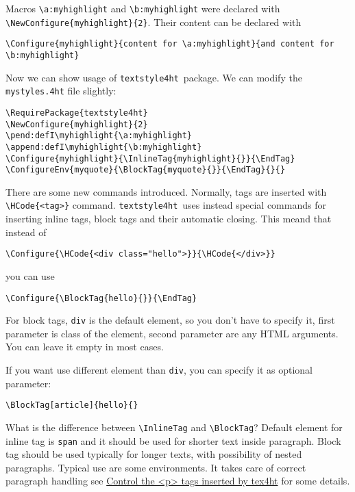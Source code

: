 \documentclass{article}
\newcommand\ts{\texttt{textstyle4ht}\ }
\begin{document}
Macros \verb|\a:myhighlight| and \verb|\b:myhighlight| were declared with \verb|\NewConfigure{myhighlight}{2}|. Their content can be declared with 

\begin{verbatim}
\Configure{myhighlight}{content for \a:myhighlight}{and content for \b:myhighlight}
\end{verbatim}

Now we can show usage of \ts package. We can modify the \texttt{mystyles.4ht} file slightly:

\begin{verbatim}
\RequirePackage{textstyle4ht}
\NewConfigure{myhighlight}{2}
\pend:defI\myhighlight{\a:myhighlight}
\append:defI\myhighlight{\b:myhighlight}
\Configure{myhighlight}{\InlineTag{myhighlight}{}}{\EndTag}
\ConfigureEnv{myquote}{\BlockTag{myquote}{}}{\EndTag}{}{}
\end{verbatim}


There are some new commands introduced. Normally, tags are inserted with
\verb|\HCode{<tag>}| command. \ts uses instead special commands for inserting
inline tags, block tags and their automatic closing. This meand that instead of 

\begin{verbatim}
\Configure{\HCode{<div class="hello">}}{\HCode{</div>}}
\end{verbatim}

you can use


\begin{verbatim}
\Configure{\BlockTag{hello}{}}{\EndTag}
\end{verbatim}

For block tags, \texttt{div} is the default element, so you don't have to
specify it, first parameter is class of the element, second parameter are any
HTML arguments. You can leave it empty in most cases.

If you want use different element than \texttt{div}, you can specify it as optional parameter:

\begin{verbatim}
\BlockTag[article]{hello}{}
\end{verbatim}

What is the difference between \verb|\InlineTag| and \verb|\BlockTag|? Default
element for inline tag is \texttt{span} and it should be used for shorter text
inside paragraph. Block tag should be used typically for longer texts, with
possibility of nested paragraphs. Typical use are some environments. It takes
care of correct paragraph handling see
\href{http://tex.stackexchange.com/a/66172/2891}{Control the <p> tags inserted
  by tex4ht} for some details.
\end{document}
